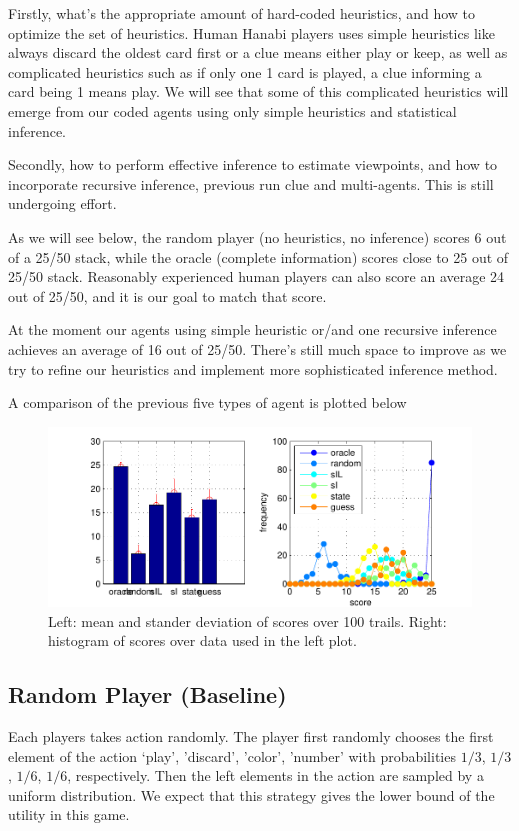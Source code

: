 \documentclass[12pt]{article}
\begin{document}
Firstly, what's the appropriate amount of hard-coded heuristics, and how to optimize the set of heuristics. Human Hanabi players uses simple heuristics like always discard the oldest card first or a clue means either play or keep, as well as complicated heuristics such as if only one 1 card is played, a clue informing a card being 1 means play. We will see that some of this complicated heuristics will emerge from our coded agents using only simple heuristics and statistical inference.

Secondly, how to perform effective inference to estimate viewpoints, and how to incorporate recursive inference, previous run clue and multi-agents. This is still undergoing effort.

As we will see below, the random player (no heuristics, no inference) scores 6 out of a 25/50 stack, while the oracle (complete information) scores close to 25 out of 25/50 stack. Reasonably experienced human players can also score an average 24 out of 25/50, and it is our goal to match that score. 

At the moment our agents using simple heuristic or/and one recursive inference achieves an average of 16 out of 25/50. There's still much space to improve as we try to refine our heuristics and implement more sophisticated inference method.

A comparison of the previous five types of agent is plotted below
\begin{figure}[hbt]
\includegraphics[width=6in]{data/data.pdf}
\caption{Left: mean and stander deviation of scores over 100 trails. Right: histogram of scores over data used in the left plot.}
\end{figure}

\subsection{Random Player (Baseline)}
Each players takes action randomly. The player first randomly chooses the first element of the action  `play', 'discard', 'color', 'number' with probabilities $1/3$, $1/3$, $1/6$, $1/6$, respectively.  Then the left elements in the action are sampled by a uniform distribution. We expect that this strategy gives the lower bound of the utility in this game.
\end{document}
